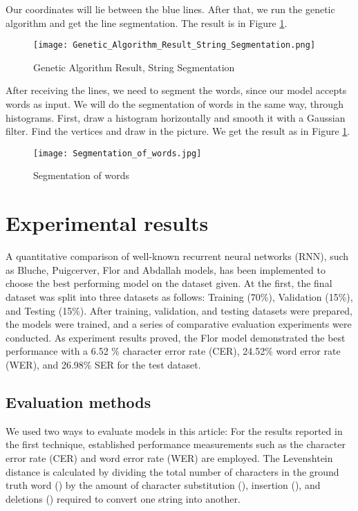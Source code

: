\documentclass[preprint,12pt]{elsarticle}
\begin{document}
Our coordinates will lie between the blue lines. After that, we run the genetic algorithm and get the line segmentation. The result is in Figure \ref{fig:segm4}.
\begin{figure}[!ht]
    \centering
    \texttt{[image: Genetic\_Algorithm\_Result\_String\_Segmentation.png]}
    \caption{Genetic Algorithm Result, String Segmentation}
    \label{fig:segm4}
\end{figure}

After receiving the lines, we need to segment the words, since our model accepts words as input. We will do the segmentation of words in the same way, through histograms. First, draw a histogram horizontally and smooth it with a Gaussian filter. Find the vertices and draw in the picture. We get the result as in Figure \ref{fig:segm4}.
\begin{figure}[!ht]
    \centering
    \texttt{[image: Segmentation\_of\_words.jpg]}
    \caption{Segmentation of words}
    \label{fig:segm5}
\end{figure}



\section{Experimental results}
\label{section:Experimental}

A quantitative comparison of well-known recurrent neural networks (RNN), such as Bluche\cite{bluche2017gated}, Puigcerver\cite{puigcerver2017multidimensional}, Flor \cite{de2020htr} and Abdallah\cite{Abdallah_2020} models, has been implemented to choose the best performing model on the dataset given. At the first, the final dataset was split into three datasets as follows: Training (70\%), Validation (15\%), and Testing (15\%).  After training, validation, and testing datasets were prepared, the models were trained, and a series of comparative evaluation experiments were conducted. As experiment results proved, the Flor model demonstrated the best performance with a 6.52 \% character error rate (CER), 24.52\% word error rate (WER), and 26.98\% SER  for the test dataset.

\subsection{Evaluation methods}
We used two ways to evaluate models in this article: For the results reported in the first technique, established performance measurements such as the character error rate (CER) and word error rate (WER)\cite{frinken2014continuous} are employed. The Levenshtein distance is calculated by dividing the total number of characters in the ground truth word () by the amount of character substitution (), insertion (), and deletions () required to convert one string into another.
\end{document}
